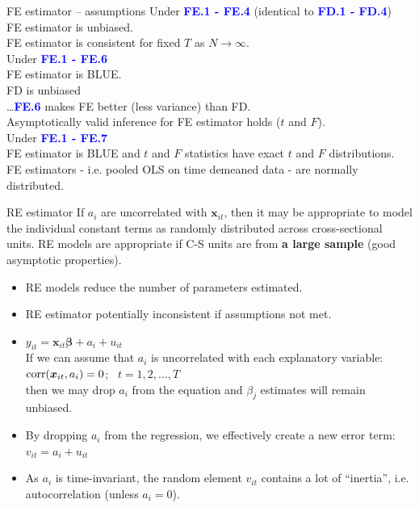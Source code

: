 \documentclass[usenames,dvipsnames]{beamer}
\begin{document}
\begin{frame}{FE estimator – assumptions}
Under \textcolor{blue}{\textbf{FE.1 - FE.4}} (identical to  \textcolor{blue}{\textbf{FD.1 - FD.4}})\\
FE estimator is unbiased. \\
FE estimator is consistent for fixed $T$ as $N \rightarrow \infty$.\\
\vspace{0.5cm}
Under \textcolor{blue}{\textbf{FE.1 - FE.6}}\\
FE estimator is BLUE.\\
FD is unbiased\\ \dots  \textcolor{blue}{\textbf{FE.6}} makes FE better (less variance) than FD.\\
Asymptotically valid inference for FE estimator holds ($t$ and $F$).\\
\vspace{0.5cm}
Under  \textcolor{blue}{\textbf{FE.1 - FE.7}}\\
FE estimator is BLUE and $t$ and $F$ statistics have exact $t$ and $F$ distributions.\\
FE estimators - i.e. pooled OLS on time demeaned data - are normally distributed.
\end{frame}
\begin{frame}{RE estimator}
\small 
If $a_i$ are uncorrelated with $\bm{x}_{it}$, then it may be appropriate to model the individual constant terms as randomly distributed across cross-sectional units. RE models are appropriate if C-S units are from \textbf{a large sample} (good asymptotic properties).
\bigskip

\begin{itemize}
\item RE models reduce the number of parameters estimated.
\item RE estimator potentially inconsistent if assumptions not met.
\item $y_{it} = \bm{x}_{it} \bm{\beta} + a_i + u_{it}$\\ \medskip
If we can assume that $a_i$ is uncorrelated with each explanatory variable: $\textnormal{corr}(\bm{x}_{it}, a_i) = 0$; \ $t = 1,2, \dots, T$ \\then we may drop $a_i$ from the equation and $\beta_j$ estimates will remain unbiased.\\
\item By dropping $a_i$ from the regression, we effectively create a new error term: $v_{it} = a_i + u_{it}$\\
\medskip
\item As $a_i$ is time-invariant, the random element $v_{it}$ contains a lot of ``inertia'', i.e. autocorrelation (unless $a_i = 0$).
\end{itemize}
\end{frame}
\end{document}
